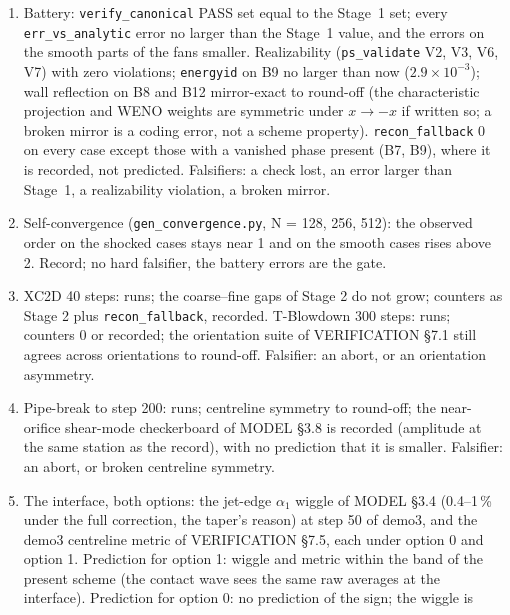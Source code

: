 \documentclass[11pt,a4paper]{article}
\newcommand{\code}[1]{\texttt{\small #1}}
\begin{document}
\begin{enumerate}[nosep]
      Abgrall--Saurel condition; a wrong in-cell term for $\alpha$ or the
      phase energies breaks it in the first step.  Falsifier: a pressure or
      velocity disturbance above $10^{-10}$ at the contact.
\item Battery: \code{verify\_canonical} PASS set equal to the Stage~1
      set; every \code{err\_vs\_analytic} error no larger than the Stage~1
      value, and the errors on the smooth parts of the fans smaller.
      Realizability (\code{ps\_validate} V2, V3, V6, V7) with zero
      violations; \code{energyid} on B9 no larger than now
      ($2.9\times10^{-3}$); wall reflection on B8 and B12 mirror-exact to
      round-off (the characteristic projection and WENO weights are
      symmetric under $x\to-x$ if written so; a broken mirror is a coding
      error, not a scheme property).  \code{recon\_fallback} 0 on every
      case except those with a vanished phase present (B7, B9), where it is
      recorded, not predicted.  Falsifiers: a check lost, an error larger
      than Stage~1, a realizability violation, a broken mirror.
\item Self-convergence (\code{gen\_convergence.py}, N = 128, 256, 512): the
      observed order on the shocked cases stays near 1 and on the smooth
      cases rises above 2.  Record; no hard falsifier, the battery errors
      are the gate.
\item XC2D 40 steps: runs; the coarse--fine gaps of Stage 2 do not grow;
      counters as Stage 2 plus \code{recon\_fallback}, recorded.
      T-Blowdown 300 steps: runs; counters 0 or recorded; the orientation
      suite of VERIFICATION \S7.1 still agrees across orientations to
      round-off.  Falsifier: an abort, or an orientation asymmetry.
\item Pipe-break to step 200: runs; centreline symmetry to round-off; the
      near-orifice shear-mode checkerboard of MODEL \S3.8 is recorded
      (amplitude at the same station as the record), with no prediction
      that it is smaller.  Falsifier: an abort, or broken centreline
      symmetry.
\item The interface, both options: the jet-edge $\alpha_1$ wiggle of
      MODEL \S3.4 (0.4--1\,\% under the full correction, the taper's
      reason) at step 50 of demo3, and the demo3 centreline metric of
      VERIFICATION \S7.5, each under option 0 and option 1.  Prediction for
      option 1: wiggle and metric within the band of the present scheme
      (the contact wave sees the same raw averages at the interface).
      Prediction for option 0: no prediction of the sign; the wiggle is

\end{enumerate}
\end{document}
